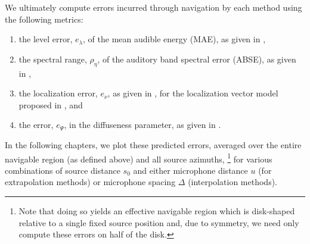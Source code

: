We ultimately compute errors incurred through navigation by each method using the following metrics:
\begin{enumerate}
\item the level error, $e_\lambda$, of the mean audible energy (MAE), as given in ,
\item the spectral range, $\rho_\eta$, of the auditory band spectral error (ABSE), as given in ,
\item the localization error, $e_\nu$, as given in , for the localization vector model proposed in , and
\item the error, $e_\Psi$, in the diffuseness parameter, as given in .
\end{enumerate}
In the following chapters, we plot these predicted errors, averaged over the entire navigable region (as defined above) and all source azimuths,%
\footnote{Note that doing so yields an effective navigable region which is disk-shaped relative to a single fixed source position and, due to symmetry, we need only compute these errors on half of the disk.}
for various combinations of source distance $s_0$ and either microphone distance $u$ (for extrapolation methods) or microphone spacing $\Delta$ (interpolation methods).